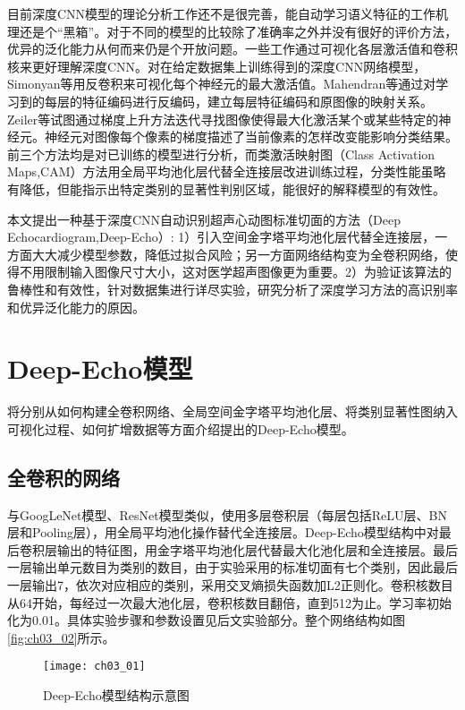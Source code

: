 目前深度CNN模型的理论分析工作还不是很完善，能自动学习语义特征的工作机理还是个“黑箱”。对于不同的模型的比较除了准确率之外并没有很好的评价方法，优异的泛化能力从何而来仍是个开放问题。一些工作\citep{simonyan14deep,Mahendran2015,Zeiler2014,Zhou2015}通过可视化各层激活值和卷积核来更好理解深度CNN。对在给定数据集上训练得到的深度CNN网络模型，Simonyan等\citep{simonyan14deep}用反卷积来可视化每个神经元的最大激活值。Mahendran等\citep{Mahendran2015}通过对学习到的每层的特征编码进行反编码，建立每层特征编码和原图像的映射关系。Zeiler等\citep{Zeiler2014}试图通过梯度上升方法迭代寻找图像使得最大化激活某个或某些特定的神经元。神经元对图像每个像素的梯度描述了当前像素的怎样改变能影响分类结果。前三个方法均是对已训练的模型进行分析，而类激活映射图（Class Activation Maps,CAM）方法\citep{Zhou2015}用全局平均池化层代替全连接层改进训练过程，分类性能虽略有降低，但能指示出特定类别的显著性判别区域，能很好的解释模型的有效性。

本文提出一种基于深度CNN自动识别超声心动图标准切面的方法（Deep Echocardiogram,Deep-Echo）:
1）引入空间金字塔平均池化层代替全连接层，一方面大大减少模型参数，降低过拟合风险；另一方面网络结构变为全卷积网络，使得不用限制输入图像尺寸大小，这对医学超声图像更为重要。2）为验证该算法的鲁棒性和有效性，针对数据集进行详尽实验，研究分析了深度学习方法的高识别率和优异泛化能力的原因。
 
\section{Deep-Echo模型}

将分别从如何构建全卷积网络、全局空间金字塔平均池化层、将类别显著性图纳入可视化过程、如何扩增数据等方面介绍提出的Deep-Echo模型。
\subsection{全卷积的网络}

与GoogLeNet模型\citep{Szegedy2015}、ResNet模型\citep{he15}类似，使用多层卷积层（每层包括ReLU层、BN层和Pooling层），用全局平均池化操作替代全连接层。Deep-Echo模型结构中对最后卷积层输出的特征图，用金字塔平均池化层\citep{He2015spp}代替最大化池化层和全连接层。最后一层输出单元数目为类别的数目，由于实验采用的标准切面有七个类别，因此最后一层输出7，依次对应相应的类别，采用交叉熵损失函数加L2正则化。卷积核数目从64开始，每经过一次最大池化层，卷积核数目翻倍，直到512为止。学习率初始化为0.01。具体实验步骤和参数设置见后文实验部分。整个网络结构如图\ref{fig:ch03_02}所示。

\begin{figure}[!htbp]
\centering
\texttt{[image: ch03\_01]}
\caption{Deep-Echo模型结构示意图}
\label{fig:ch03_01}
\end{figure}

